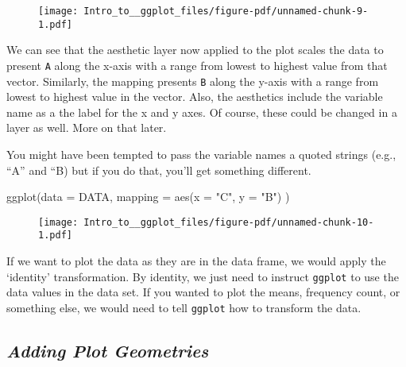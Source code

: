 \documentclass[
  letterpaper,
  DIV=11,
  numbers=noendperiod]{scrartcl}
\newenvironment{Shaded}{\begin{snugshade}}{\end{snugshade}}
\newcommand{\AttributeTok}[1]{\textcolor[rgb]{0.40,0.45,0.13}{#1}}
\newcommand{\FunctionTok}[1]{\textcolor[rgb]{0.28,0.35,0.67}{#1}}
\newcommand{\NormalTok}[1]{\textcolor[rgb]{0.00,0.23,0.31}{#1}}
\newcommand{\StringTok}[1]{\textcolor[rgb]{0.13,0.47,0.30}{#1}}
\begin{document}
\begin{figure}[H]

{\centering \texttt{[image: Intro\_to\_\_ggplot\_files/figure-pdf/unnamed-chunk-9-1.pdf]}

}

\end{figure}

We can see that the aesthetic layer now applied to the plot scales the
data to present \texttt{A} along the x-axis with a range from lowest to
highest value from that vector. Similarly, the mapping presents
\texttt{B} along the y-axis with a range from lowest to highest value in
the vector. Also, the aesthetics include the variable name as a the
label for the x and y axes. Of course, these could be changed in a layer
as well. More on that later.

You might have been tempted to pass the variable names a quoted strings
(e.g., ``A'' and ``B) but if you do that, you'll get something
different.

\begin{Shaded}
\begin{Highlighting}[]
\FunctionTok{ggplot}\NormalTok{(}\AttributeTok{data =}\NormalTok{ DATA, }
       \AttributeTok{mapping =} \FunctionTok{aes}\NormalTok{(}\AttributeTok{x =} \StringTok{"C"}\NormalTok{, }\AttributeTok{y =} \StringTok{"B"}\NormalTok{)}
\NormalTok{       )}
\end{Highlighting}
\end{Shaded}

\begin{figure}[H]

{\centering \texttt{[image: Intro\_to\_\_ggplot\_files/figure-pdf/unnamed-chunk-10-1.pdf]}

}

\end{figure}

If we want to plot the data as they are in the data frame, we would
apply the `identity' transformation. By identity, we just need to
instruct \texttt{ggplot} to use the data values in the data set. If you
wanted to plot the means, frequency count, or something else, we would
need to tell \texttt{ggplot} how to transform the data.

\hypertarget{adding-plot-geometries}{%
\subsection{\texorpdfstring{\emph{Adding Plot
Geometries}}{Adding Plot Geometries}}\label{adding-plot-geometries}}
\end{document}
